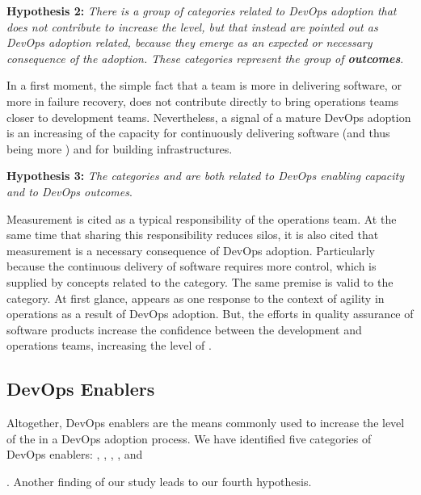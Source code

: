 \begin{mh}
\begin{mh}
\textbf{Hypothesis 2:} \textit{There is a group of categories related to DevOps adoption
that does not contribute to increase the} \cc \emph{level, but that instead are
pointed out as DevOps adoption related, because they emerge as an expected or
necessary consequence of the adoption. These categories represent the group of
\textbf{outcomes}}.
\end{mh}

In a first moment, the simple fact that a team is more
 in delivering software, or more  in failure recovery, does not
contribute directly to bring operations teams closer to development teams.
Nevertheless, a signal of a mature DevOps adoption is an increasing of the capacity for continuously
delivering software (and thus being more )
and for building  infrastructures.

\begin{mh}
\textbf{Hypothesis 3:} \textit{The categories  and 
are both related to DevOps enabling capacity and to DevOps outcomes}.
\end{mh}

Measurement is cited as a typical responsibility of the operations team.
At the same time that sharing this responsibility reduces silos,
it is also cited that measurement is a necessary consequence of DevOps adoption. Particularly because
the continuous delivery of software requires more control,
which is supplied by concepts related to the  category.
The same premise is valid to the  category. At first glance,
 appears as one response to the context of agility in operations
as a result of DevOps adoption. But, the efforts in quality assurance of software products
increase the confidence between the development and operations teams, increasing the level
of \cc.

\subsection{DevOps Enablers}

Altogether, DevOps enablers are the means commonly used to increase the level of
the \cc in a DevOps adoption process.
We have identified five categories of DevOps enablers:
, , ,
, and {. Another finding of our
study leads to our fourth hypothesis.

}
\end{mh}
